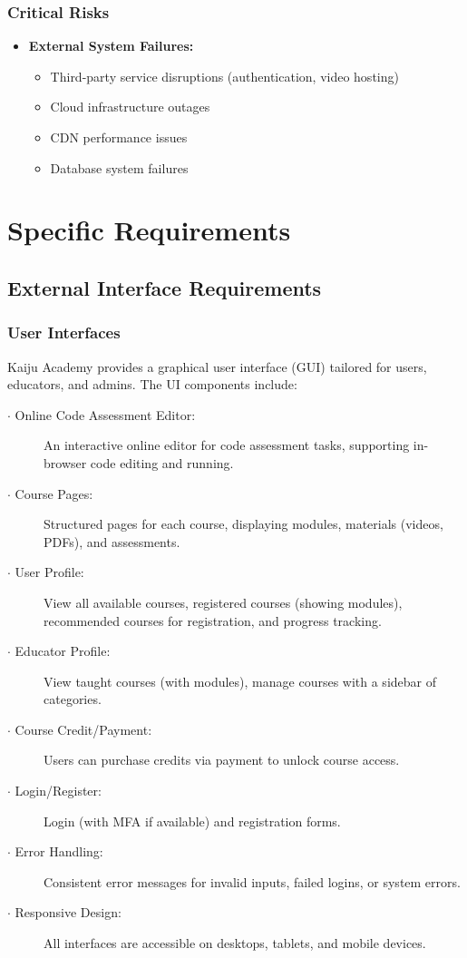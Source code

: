 \documentclass[a4paper, 11pt]{scrreprt}
\begin{document}
\subsection{Critical Risks}
\begin{itemize}
    \item \textbf{External System Failures:}
        \begin{itemize}
            \item Third-party service disruptions (authentication, video hosting)
            \item Cloud infrastructure outages
            \item CDN performance issues
            \item Database system failures
        \end{itemize}
\end{itemize}


\chapter{Specific Requirements}

\section{External Interface Requirements}
\subsection{User Interfaces}

Kaiju Academy provides a graphical user interface (GUI) tailored for users, educators, and admins. The UI components include:

\begin{description}
    \item[$\cdot$ Online Code Assessment Editor:] An interactive online editor for code assessment tasks, supporting in-browser code editing and running.
    \item[$\cdot$ Course Pages:] Structured pages for each course, displaying modules, materials (videos, PDFs), and assessments.
    \item[$\cdot$ User Profile:] View all available courses, registered courses (showing modules), recommended courses for registration, and progress tracking.
    \item[$\cdot$ Educator Profile:] View taught courses (with modules), manage courses with a sidebar of categories.
    \item[$\cdot$ Course Credit/Payment:] Users can purchase credits via payment to unlock course access.
    \item[$\cdot$ Login/Register:] Login (with MFA if available) and registration forms.
    \item[$\cdot$ Error Handling:] Consistent error messages for invalid inputs, failed logins, or system errors.
    \item[$\cdot$ Responsive Design:] All interfaces are accessible on desktops, tablets, and mobile devices.
\end{description}
\end{document}
